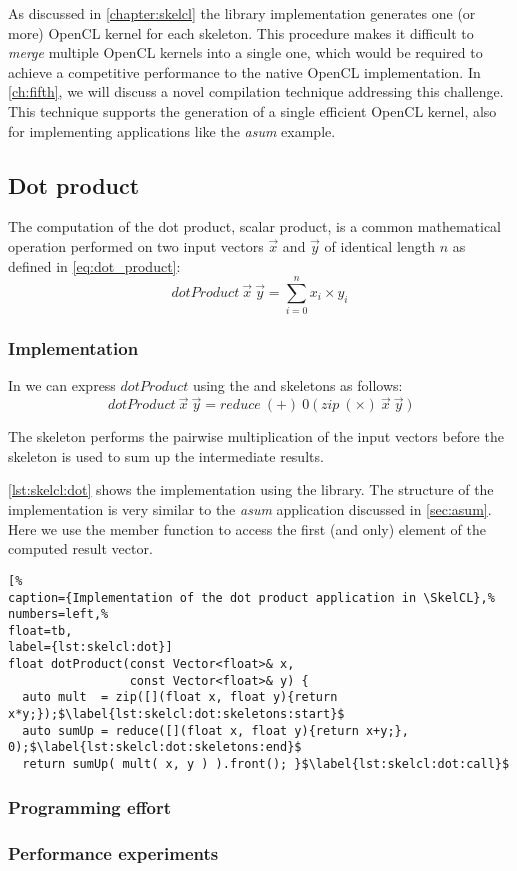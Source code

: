 As discussed in \autoref{chapter:skelcl} the \SkelCL library implementation generates one (or more) OpenCL kernel for each skeleton.
This procedure makes it difficult to \emph{merge} multiple OpenCL kernels into a single one, which would be required to achieve a competitive performance to the native OpenCL implementation.
In \autoref{ch:fifth}, we will discuss a novel compilation technique addressing this challenge.
This technique supports the generation of a single efficient OpenCL kernel, also for implementing applications like the \emph{asum} example.

\subsection{Dot product}
\label{sec:dot}
The computation of the dot product, \aka scalar product, is a common mathematical operation performed on two input vectors $\vec{x}$ and $\vec{y}$ of identical length $n$ as defined in \autoref{eq:dot_product}:
\begin{equation}
  dotProduct\ \vec{x}\ \vec{y} = \sum_{i=0}^{n} x_i \times y_i
  \label{eq:dot_product}
\end{equation}

\subsubsection*{\SkelCL Implementation}
In \SkelCL we can express $dotProduct$ using the \zip and \reduce skeletons as follows:
\begin{equation}
  dotProduct\ \vec{x}\ \vec{y} = reduce\ (+)\ 0\ \big(\ zip\ (\times)\ \vec{x}\ \vec{y}\ \big)
\end{equation}

The \zip skeleton performs the pairwise multiplication of the input vectors before the \reduce skeleton is used to sum up the intermediate results.

\autoref{lst:skelcl:dot} shows the implementation using the \SkelCL library.
The structure of the implementation is very similar to the \emph{asum} application discussed in \autoref{sec:asum}.
Here we use the  member function to access the first (and only) element of the computed result vector.

\begin{lstlisting}[%                                                             
caption={Implementation of the dot product application in \SkelCL},%
numbers=left,%
float=tb,
label={lst:skelcl:dot}]
float dotProduct(const Vector<float>& x,
                 const Vector<float>& y) {
  auto mult  = zip([](float x, float y){return x*y;});$\label{lst:skelcl:dot:skeletons:start}$
  auto sumUp = reduce([](float x, float y){return x+y;}, 0);$\label{lst:skelcl:dot:skeletons:end}$
  return sumUp( mult( x, y ) ).front(); }$\label{lst:skelcl:dot:call}$
\end{lstlisting}

\subsubsection*{Programming effort}

\subsubsection*{Performance experiments}



